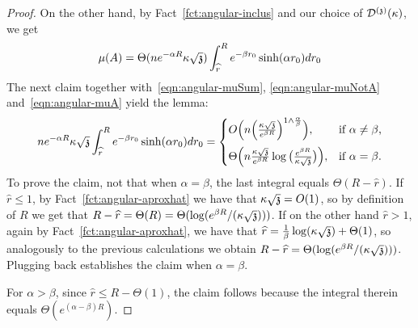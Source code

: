 \begin{proof}
On the other hand, by Fact~\ref{fct:angular-inclus} and our choice of $\dt(\kappa)$, we get 
\begin{equation}\label{eqn:angular-muA}
\mu(A)= \Theta(ne^{-\alpha R}\kappa\sqrt{\ss})\int_{\widehat{r}}^R e^{-\beta r_0}\sinh(\alpha r_0)dr_0
\end{equation}
The next claim together with~\eqref{eqn:angular-muSum},  \eqref{eqn:angular-muNotA} and~\eqref{eqn:angular-muA} yield the lemma:
\[
ne^{-\alpha R}\kappa\sqrt{\ss}\int_{\widehat{r}}^R e^{-\beta r_0}\sinh(\alpha r_0)dr_0 =
\begin{cases}
O\Big(n\Big(\frac{\kappa\sqrt{\ss}}{e^{\beta R}}\Big)^{1\wedge \frac{\alpha}{\beta}}\Big),
& \text{if $\alpha\neq\beta$,} \\[8pt]
\Theta\Big(n\frac{\kappa\sqrt{\ss}}{e^{\beta R}}\log\big(\frac{e^{\beta R}}{\kappa\sqrt{\ss}}\big)\Big),
& \text{if $\alpha=\beta$.}
\end{cases}
\]
To prove the claim, not that when $\alpha=\beta$, the last integral equals $\Theta(R-\widehat{r})$.
If $\widehat{r}\leq 1$, by Fact~\ref{fct:angular-aproxhat} we have that $\kappa\sqrt{\ss}=O(1)$,
  so by definition of $R$ we get that $R-\widehat{r}=\Theta(R)=\Theta(\log(e^{\beta R}/(\kappa\sqrt{\ss})))$.
If on the other hand $\widehat{r}>1$, again by Fact~\ref{fct:angular-aproxhat}, we have that $\widehat{r}=\frac{1}{\beta}\log(\kappa\sqrt{\ss})+\Theta(1)$,
  so analogously to the previous calculations we obtain
  $R-\widehat{r}=\Theta(\log(e^{\beta R}/(\kappa\sqrt{\ss})))$.
Plugging back  establishes the claim when $\alpha=\beta$.  

For $\alpha > \beta$, since $\widehat{r}\leq R-\Theta(1)$, the claim follows 
because the integral therein
equals $\Theta(e^{(\alpha-\beta)R})$.


\end{proof}
